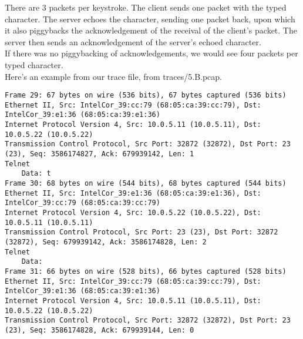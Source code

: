 There are 3 packets per keystroke. The client sends one packet with the typed character. The server echoes the character, sending one packet back, upon which it also piggybacks the acknowledgement of the receival of the client's packet. The server then sends an acknowledgement of the server's echoed character. \\
If there was no piggybacking of acknowledgements, we would see four packets per typed character. \\
Here's an example from our trace file, from traces/5.B.pcap.

\begin{lstlisting}
Frame 29: 67 bytes on wire (536 bits), 67 bytes captured (536 bits)
Ethernet II, Src: IntelCor_39:cc:79 (68:05:ca:39:cc:79), Dst: IntelCor_39:e1:36 (68:05:ca:39:e1:36)
Internet Protocol Version 4, Src: 10.0.5.11 (10.0.5.11), Dst: 10.0.5.22 (10.0.5.22)
Transmission Control Protocol, Src Port: 32872 (32872), Dst Port: 23 (23), Seq: 3586174827, Ack: 679939142, Len: 1
Telnet
    Data: t
Frame 30: 68 bytes on wire (544 bits), 68 bytes captured (544 bits)
Ethernet II, Src: IntelCor_39:e1:36 (68:05:ca:39:e1:36), Dst: IntelCor_39:cc:79 (68:05:ca:39:cc:79)
Internet Protocol Version 4, Src: 10.0.5.22 (10.0.5.22), Dst: 10.0.5.11 (10.0.5.11)
Transmission Control Protocol, Src Port: 23 (23), Dst Port: 32872 (32872), Seq: 679939142, Ack: 3586174828, Len: 2
Telnet
    Data: 
Frame 31: 66 bytes on wire (528 bits), 66 bytes captured (528 bits)
Ethernet II, Src: IntelCor_39:cc:79 (68:05:ca:39:cc:79), Dst: IntelCor_39:e1:36 (68:05:ca:39:e1:36)
Internet Protocol Version 4, Src: 10.0.5.11 (10.0.5.11), Dst: 10.0.5.22 (10.0.5.22)
Transmission Control Protocol, Src Port: 32872 (32872), Dst Port: 23 (23), Seq: 3586174828, Ack: 679939144, Len: 0
\end{lstlisting}